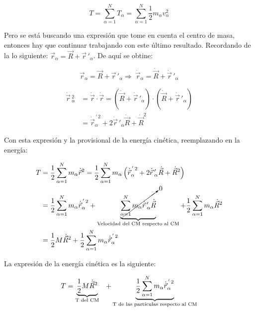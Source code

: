 \documentclass[/home/hernan-barquero/Documents/Apuntes_mecanica_teorica/main.tex]{subfiles}
\begin{document}
	\begin{equation*}
		T = \sum_{\alpha =1}^{N} T_{\alpha} = \sum_{\alpha =1}^{N} \frac{1}{2} m_{\alpha}v_{\alpha}^{2}	
	\end{equation*}

	Pero se está buscando una expresión que tome en cuenta el centro de masa, entonces hay que continuar trabajando con este último resultado. Recordando de la  lo siguiente: $\vec{r}_{\alpha} = \vec{R} + {\vec{r}}\,'_{\alpha}$. De aquí se obtine:

	\begin{equation*}
		\vec{r}_{\alpha} = \vec{R} + {\vec{r}}\,'_{\alpha} \Rightarrow \; \dot{\vec{r}}_{\alpha} = \dot{\vec{R}} + {\dot{\vec{r}}}\,'_{\alpha}
	\end{equation*}

	\begin{align*}
		\dot{\vec{r}}\,^{2}_{\alpha} &= \dot{\vec{r}} \cdot \dot{\vec{r}} = \left( \dot{\vec{R}} + {\dot{\vec{r}}}\,'_{\alpha} \right) \cdot \left( \dot{\vec{R}} + {\dot{\vec{r}}}\,'_{\alpha} \right) \\ 
		& = {\dot{\vec{r}}}^{\,'\,2}_{\alpha} + 2 {\dot{\vec{r}}}\,'_{\alpha} \dot{\vec{R}} + \dot{\vec{R}}^{2}
	\end{align*}

	Con esta expresión y la provisional de la energía cinética, reemplazando en la energía:

	\begin{align*}
		T & = \frac{1}{2} \sum_{\alpha =1}^{N} m_{\alpha} \dot{\vec{r}}^{2} = \frac{1}{2} \sum_{\alpha =1}^{N} m_{\alpha} \left( {\dot{\vec{r}}}^{\,'\,2}_{\alpha} + 2 {\dot{\vec{r}}}\,'_{\alpha} \dot{\vec{R}} + \dot{\vec{R}}^{2}\right) \\ 
		& = \frac{1}{2} \sum_{\alpha =1}^{N} m_{\alpha} {\dot{\vec{r}}}^{\,'\,2}_{\alpha} + \underbrace{\cancelto{0}{\sum_{\alpha =1}^{N} m_{\alpha} {\dot{\vec{r}}}\,'_{\alpha} \dot{\vec{R}}}}_{\textup{Velocidad del CM respecto al CM}} + \frac{1}{2} \sum_{\alpha =1}^{N} m_{\alpha} \dot{\vec{R}}^{2} \\ 
		& = \frac{1}{2} M \dot{\vec{R}}^{2} + \frac{1}{2} \sum_{\alpha =1}^{N} m_{\alpha} {\dot{\vec{r}}}^{\,'\,2}_{\alpha}
	\end{align*}

	\newpage

	\begin{definition} 
		La expresión de la energía cinética es la siguiente:

		\begin{equation}
			T = \underbrace{\frac{1}{2} M \dot{\vec{R}}^{2}}_{\textup{T del CM}} \; \; \; + \underbrace{\frac{1}{2} \sum_{\alpha =1}^{N} m_{\alpha} {\dot{\vec{r}}}^{\,'\,2}_{\alpha}}_{\textup{T de las partículas respecto al CM}}
			\label{eq: sisT}
		\end{equation}
	\end{definition}
\end{document}
